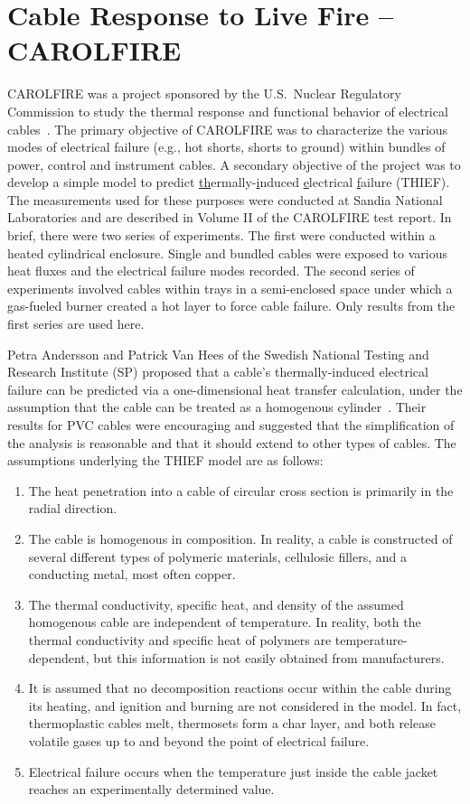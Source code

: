 \section{Cable Response to Live Fire -- CAROLFIRE}

CAROLFIRE was a project sponsored by the U.S.~Nuclear Regulatory Commission to study the thermal response and functional behavior of electrical cables~\cite{CAROLFIRE}. The primary objective of CAROLFIRE was to characterize the various modes of electrical failure (e.g., hot shorts, shorts to ground) within bundles of power, control and instrument cables. A secondary objective of the project was to develop a simple model to predict \underline{th}ermally-\underline{i}nduced \underline{e}lectrical \underline{f}ailure (THIEF). The measurements used for these purposes were conducted at Sandia National Laboratories and are described in Volume II of the CAROLFIRE test report. In brief, there were two series of experiments. The first were conducted within a heated cylindrical enclosure. Single and bundled cables were exposed to various heat fluxes and the electrical failure modes recorded. The second series of experiments involved cables within trays in a semi-enclosed space under which a gas-fueled burner created a hot layer to force cable failure. Only results from the first series are used here.

Petra Andersson and Patrick Van Hees of the Swedish National Testing and Research Institute (SP) proposed that a cable's thermally-induced electrical failure can be predicted via a one-dimensional heat transfer calculation, under the assumption that the cable can be treated as a homogenous cylinder~\cite{Andersson:2005}. Their results for PVC cables were encouraging and suggested that the simplification of the analysis is reasonable and that it should extend to other types of cables. The assumptions underlying the THIEF model are as follows:
\begin{enumerate}
\item The heat penetration into a cable of circular cross section is primarily in the radial direction. 
\item The cable is homogenous in composition. In reality, a cable is constructed of several different types of polymeric materials, cellulosic fillers, and a conducting metal, most often copper.
\item The thermal conductivity, specific heat, and density of the assumed homogenous cable are independent of temperature. In reality, both the thermal conductivity and specific heat of polymers are temperature-dependent, but this information is not easily obtained from manufacturers.
\item It is assumed that no decomposition reactions occur within the cable during its heating, and ignition and burning are not considered in the model. In fact, thermoplastic cables melt, thermosets form a char layer, and both release volatile gases up to and beyond the point of electrical failure.
\item Electrical failure occurs when the temperature just inside the cable jacket reaches an experimentally determined value.
\end{enumerate}




